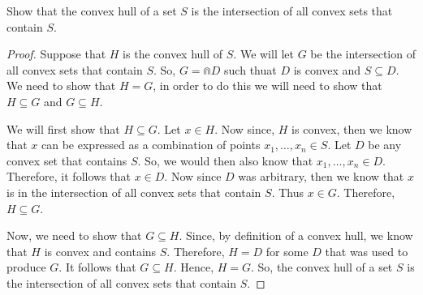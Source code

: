 \begin{prob}[1.2]
  Show that the convex hull of a set $S$ is the intersection of all convex
  sets that contain $S$.
\end{prob}
\begin{proof}
  Suppose that $H$ is the convex hull of $S$.  We will let $G$ be the
  intersection of all convex sets that contain $S$.  So,
  $G = \Cap D$ such thuat $D$ is convex and $S \subseteq D$.
  We need to show that $H = G$, in order to do this we will need to show that
  $H \subseteq G$ and $G \subseteq H$.

  We will first show that $H \subseteq G$.  Let $x \in H$.  Now since, $H$ is
  convex, then we know that $x$ can be expressed as a combination of points
  $x_{1}, \ldots,x_{n} \in S$. Let $D$ be any convex set that contains $S$. So,
  we would then also know that $x_{1}, \ldots,x_{n} \in D$. Therefore, it
  follows that $x \in D$. Now since $D$ was arbitrary, then we know that
  $x$ is in the intersection of all convex sets that contain $S$. Thus
  $x \in G$.  Therefore, $H \subseteq G$.

  Now, we need to show that $G \subseteq H$.  Since, by definition of a convex
  hull, we know that $H$ is convex and contains $S$.  Therefore, $H = D$ for
  some $D$ that was used to produce $G$. It follows that $G \subseteq H$.
  Hence, $H = G$. So, the convex hull of a set $S$ is the intersection of all
  convex sets that contain $S$.
\end{proof}

